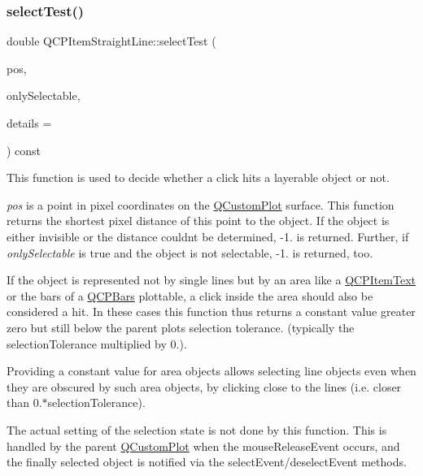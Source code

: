 \subsubsection{\texorpdfstring{select\+Test()}{selectTest()}}
{\footnotesize\ttfamily double Q\+C\+P\+Item\+Straight\+Line\+::select\+Test (\begin{DoxyParamCaption}\item[{const Q\+PointF \&}]{pos,  }\item[{bool}]{only\+Selectable,  }\item[{Q\+Variant $\ast$}]{details = {} }\end{DoxyParamCaption}) const\hspace{0.3cm}{\ttfamily [virtual]}}

This function is used to decide whether a click hits a layerable object or not.

{\itshape pos} is a point in pixel coordinates on the \mbox{\hyperlink{class_q_custom_plot}{Q\+Custom\+Plot}} surface. This function returns the shortest pixel distance of this point to the object. If the object is either invisible or the distance couldn\textquotesingle{}t be determined, -\/1. is returned. Further, if {\itshape only\+Selectable} is true and the object is not selectable, -\/1. is returned, too.

If the object is represented not by single lines but by an area like a \mbox{\hyperlink{class_q_c_p_item_text}{Q\+C\+P\+Item\+Text}} or the bars of a \mbox{\hyperlink{class_q_c_p_bars}{Q\+C\+P\+Bars}} plottable, a click inside the area should also be considered a hit. In these cases this function thus returns a constant value greater zero but still below the parent plot\textquotesingle{}s selection tolerance. (typically the selection\+Tolerance multiplied by 0.).

Providing a constant value for area objects allows selecting line objects even when they are obscured by such area objects, by clicking close to the lines (i.\+e. closer than 0.$\ast$selection\+Tolerance).

The actual setting of the selection state is not done by this function. This is handled by the parent \mbox{\hyperlink{class_q_custom_plot}{Q\+Custom\+Plot}} when the mouse\+Release\+Event occurs, and the finally selected object is notified via the select\+Event/deselect\+Event methods.

